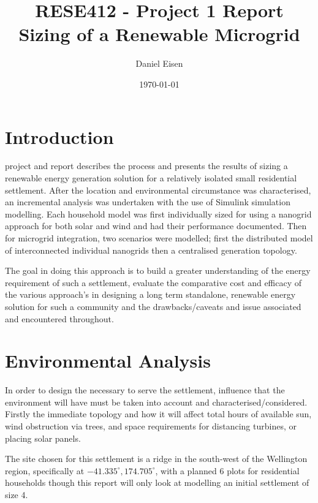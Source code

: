 \documentclass[journal]{IEEEtran}
\title{RESE412 - Project 1 Report \\ Sizing of a Renewable Microgrid}
\author{Daniel Eisen}
\date{\today}
\begin{document}
\onecolumn
\maketitle
\tableofcontents
\twocolumn
\section{Introduction}
 project and report describes the process and presents the results of sizing a renewable energy generation solution for a relatively isolated small residential settlement. After the location and environmental circumstance was characterised, an incremental analysis was undertaken with the use of Simulink simulation modelling. Each household model was first individually sized for using a nanogrid approach for both solar and wind and had their performance documented. Then for microgrid integration, two scenarios were modelled; first the distributed model of interconnected individual nanogrids then a centralised generation topology.

The goal in doing this approach is to build a greater understanding of the energy requirement of such a settlement, evaluate the comparative cost and efficacy of the various approach's in designing a long term standalone, renewable energy solution for such a community and the drawbacks/caveats and issue associated and encountered throughout. 

\section{Environmental Analysis}
In order to design the necessary to serve the settlement, influence that the environment will have must be taken into account and characterised/considered. Firstly the immediate topology and how it will affect total hours of available sun, wind obstruction via trees, and space requirements for distancing turbines, or placing solar panels.

The site chosen for this settlement is a ridge in the south-west of the Wellington region, specifically at $-41.335^{\circ}, 174.705^{\circ}$, with a planned 6 plots for residential households though this report will only look at modelling an initial settlement of size 4.
\end{document}
